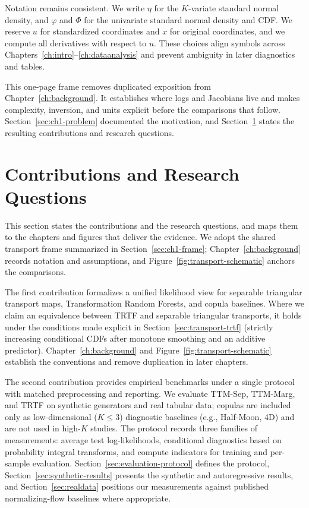 \documentclass[11pt,a4paper,twoside]{book}\usepackage[]{graphicx}\usepackage[]{xcolor}
\begin{document}
Notation remains consistent. We write $\eta$ for the $K$-variate standard normal density, and $\varphi$ and $\Phi$ for the univariate standard normal density and CDF. We reserve $u$ for standardized coordinates and $x$ for original coordinates, and we compute all derivatives with respect to $u$. These choices align symbols across Chapters~\ref{ch:intro}--\ref{ch:dataanalysis} and prevent ambiguity in later diagnostics and tables.

This one-page frame removes duplicated exposition from Chapter~\ref{ch:background}. It establishes where logs and Jacobians live and makes complexity, inversion, and units explicit before the comparisons that follow. Section~\ref{sec:ch1-problem} documented the motivation, and Section~\ref{sec:ch1-contributions} states the resulting contributions and research questions.

\section{Contributions and Research Questions}\label{sec:ch1-contributions}
This section states the contributions and the research questions, and maps them to the chapters and figures that deliver the evidence. We adopt the shared transport frame summarized in Section~\ref{sec:ch1-frame}; Chapter~\ref{ch:background} records notation and assumptions, and Figure~\ref{fig:transport-schematic} anchors the comparisons.

The first contribution formalizes a unified likelihood view for separable triangular transport maps, Transformation Random Forests, and copula baselines. Where we claim an equivalence between TRTF and separable triangular transports, it holds under the conditions made explicit in Section~\ref{sec:transport-trtf} (strictly increasing conditional CDFs after monotone smoothing and an additive predictor). Chapter~\ref{ch:background} and Figure~\ref{fig:transport-schematic} establish the conventions and remove duplication in later chapters.

The second contribution provides empirical benchmarks under a single protocol with matched preprocessing and reporting. We evaluate TTM-Sep, TTM-Marg, and TRTF on synthetic generators and real tabular data; copulas are included only as low-dimensional ($K\!\le\!3$) diagnostic baselines (e.g., Half-Moon, 4D) and are not used in high-$K$ studies. The protocol records three families of measurements: average test log-likelihoods, conditional diagnostics based on probability integral transforms, and compute indicators for training and per-sample evaluation. Section~\ref{sec:evaluation-protocol} defines the protocol, Section~\ref{sec:synthetic-results} presents the synthetic and autoregressive results, and Section~\ref{sec:realdata} positions our measurements against published normalizing-flow baselines where appropriate.
\end{document}
